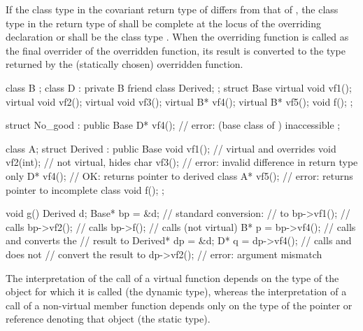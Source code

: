 \pnum
If the class type in the covariant return type of  differs from that of
, the class type in the return type of  shall be
complete at the locus of the overriding declaration or shall be the
class type . When the overriding function is called as the
final overrider of the overridden function, its result is converted to
the type returned by the (statically chosen) overridden
function.
\begin{example}
\begin{codeblock}
class B { };
class D : private B { friend class Derived; };
struct Base {
  virtual void vf1();
  virtual void vf2();
  virtual void vf3();
  virtual B*   vf4();
  virtual B*   vf5();
  void f();
};

struct No_good : public Base {
  D*  vf4();        // error:  (base class of ) inaccessible
};

class A;
struct Derived : public Base {
    void vf1();     // virtual and overrides 
    void vf2(int);  // not virtual, hides 
    char vf3();     // error: invalid difference in return type only
    D*   vf4();     // OK: returns pointer to derived class
    A*   vf5();     // error: returns pointer to incomplete class
    void f();
};

void g() {
  Derived d;
  Base* bp = &d;                // standard conversion:
                                //  to 
  bp->vf1();                    // calls 
  bp->vf2();                    // calls 
  bp->f();                      // calls  (not virtual)
  B*  p = bp->vf4();            // calls  and converts the
                                // result to 
  Derived*  dp = &d;
  D*  q = dp->vf4();            // calls  and does not
                                // convert the result to 
  dp->vf2();                    // error: argument mismatch
}
\end{codeblock}
\end{example}

\pnum
\begin{note}
The interpretation of the call of a virtual function depends on the type
of the object for which it is called (the dynamic type), whereas the
interpretation of a call of a non-virtual member function depends only
on the type of the pointer or reference denoting that object (the static
type).
\end{note}

